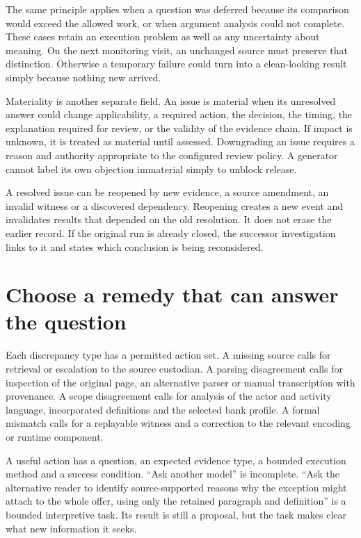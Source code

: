 \documentclass[12pt,a4paper,oneside,openany]{book}
\begin{document}
The same principle applies when a question was deferred because its comparison
would exceed the allowed work, or when argument analysis could not complete.
These cases retain an execution problem as well as any uncertainty about
meaning. On the next monitoring visit, an unchanged source must preserve that
distinction. Otherwise a temporary failure could turn into a clean-looking
result simply because nothing new arrived.

Materiality is another separate field. An issue is material when its unresolved
answer could change applicability, a required action, the decision, the timing,
the explanation required for review, or the validity of the evidence chain. If
impact is unknown, it is treated as material until assessed. Downgrading an issue
requires a reason and authority appropriate to the configured review policy.
A generator cannot label its own objection immaterial simply to unblock release.

A resolved issue can be reopened by new evidence, a source amendment, an invalid
witness or a discovered dependency. Reopening creates a new event and invalidates
results that depended on the old resolution. It does not erase the earlier
record. If the original run is already closed, the successor investigation links
to it and states which conclusion is being reconsidered.

\section{Choose a remedy that can answer the question}
\label{merge:M06:08}


Each discrepancy type has a permitted action set. A missing source calls for
retrieval or escalation to the source custodian. A parsing disagreement calls for
inspection of the original page, an alternative parser or manual transcription
with provenance. A scope disagreement calls for analysis of the actor and
activity language, incorporated definitions and the selected bank profile. A
formal mismatch calls for a replayable witness and a correction to the relevant
encoding or runtime component.

A useful action has a question, an expected evidence type, a bounded execution
method and a success condition. ``Ask another model'' is incomplete. ``Ask the
alternative reader to identify source-supported reasons why the exception might
attach to the whole offer, using only the retained paragraph and definition'' is
a bounded interpretive task. Its result is still a proposal, but the task makes
clear what new information it seeks.
\end{document}
